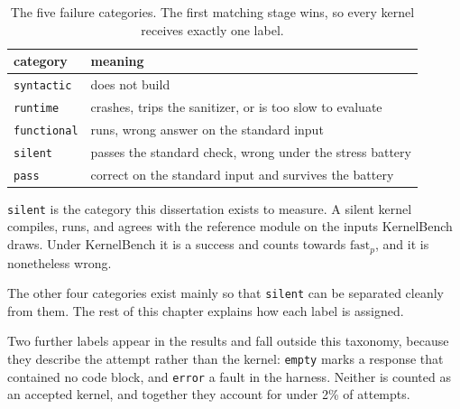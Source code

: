\documentclass[12pt]{article}
\begin{document}
\begin{table}[htbp]
\centering
\begin{tabular}{ll}
\toprule
category & meaning \\
\midrule
\texttt{syntactic}  & does not build \\
\texttt{runtime}    & crashes, trips the sanitizer, or is too slow to evaluate \\
\texttt{functional} & runs, wrong answer on the standard input \\
\texttt{silent}     & passes the standard check, wrong under the stress battery \\
\texttt{pass}       & correct on the standard input and survives the battery \\
\bottomrule
\end{tabular}
\caption{The five failure categories. The first matching stage wins, so every
kernel receives exactly one label.}
\label{tab:taxonomy}
\end{table}

\texttt{silent} is the category this dissertation exists to measure. A silent
kernel compiles, runs, and agrees with the reference module on the inputs
KernelBench draws. Under KernelBench it is a success and counts towards
$\mathrm{fast}_p$, and it is nonetheless wrong.

The other four categories exist mainly so that \texttt{silent} can be separated
cleanly from them. The rest of this chapter explains how each label is
assigned.

Two further labels appear in the results and fall outside this taxonomy,
because they describe the attempt rather than the kernel: \texttt{empty} marks
a response that contained no code block, and \texttt{error} a fault in the
harness. Neither is counted as an accepted kernel, and together they account
for under 2\% of attempts.
\end{document}
